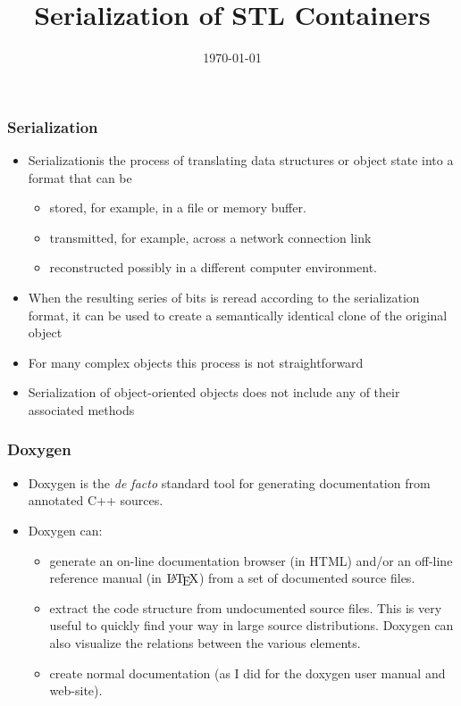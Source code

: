 \documentclass{beamer}
\begin{document}
\title{Serialization of STL Containers}
\date{\today}

\begin{frame}
\maketitle
\end{frame}

\begin{frame}
\frametitle{Serialization}

\begin{itemize}
\item \alert{Serialization}is the process of translating data structures or object state into a format that can be 
\begin{itemize} 
\item \alert{stored}, for example, in a file or memory buffer.
\item \alert{transmitted}, for example, across a network connection link
\item \alert{reconstructed} possibly in a different computer environment.
\end{itemize}
\item When the resulting series of bits is reread according to the serialization format, it can be used to create a semantically identical clone of the original object
\item For many complex objects this process is not straightforward
\item Serialization of object-oriented objects does not include any of their associated methods
\end{itemize}
\end{frame}


\begin{frame}
\frametitle{Doxygen}

\begin{itemize}
\item \alert{Doxygen} is the \textit{de facto} standard tool for generating documentation from annotated C++ sources. 
\item Doxygen can:
\begin{itemize}
\item generate an on-line documentation browser (in HTML) and/or an off-line reference manual (in $\mbox{\LaTeX}$) from a set of documented source files. 
\item extract the code structure from undocumented source files. This is very useful to quickly find your way in large source distributions. Doxygen can also \alert{visualize} the relations between the various elements.
\item create normal documentation (as I did for the doxygen user manual and web-site).
\end{itemize}
\end{itemize}

\end{frame}
\end{document}
